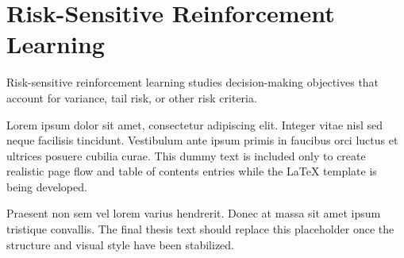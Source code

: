 \section{Risk-Sensitive Reinforcement Learning}

Risk-sensitive reinforcement learning studies decision-making objectives that account for variance, tail risk, or other risk criteria.

Lorem ipsum dolor sit amet, consectetur adipiscing elit. Integer vitae nisl sed neque facilisis tincidunt. Vestibulum ante ipsum primis in faucibus orci luctus et ultrices posuere cubilia curae. This dummy text is included only to create realistic page flow and table of contents entries while the LaTeX template is being developed.

Praesent non sem vel lorem varius hendrerit. Donec at massa sit amet ipsum tristique convallis. The final thesis text should replace this placeholder once the structure and visual style have been stabilized.

